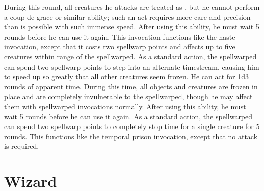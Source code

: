 During this round, all creatures he attacks are treated as \helpless, but he cannot perform a coup de grace or similar ability; such an act requires more care and precision than is possible with such immense speed.
After using this ability, he must wait 5 rounds before he can use it again.
This invocation functions like the haste invocation, except that it costs two spellwarp points and affects up to five creatures within \rngclose range of the spellwarped.
As a standard action, the spellwarped can spend two spellwarp points to step into an alternate timestream, causing him to speed up so greatly that all other creatures seem frozen.
He can act for 1d3 rounds of apparent time.
During this time, all objects and creatures are frozen in place and are completely invulnerable to the spellwarped, though he may affect them with spellwarped invocations normally.
After using this ability, he must wait 5 rounds before he can use it again.
As a standard action, the spellwarped can spend two spellwarp points to completely stop time for a single creature for 5 rounds.
This functions like the temporal prison invocation, except that no attack is required.
\norepeatnotes

\section{Wizard}

